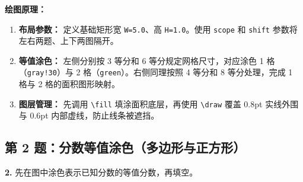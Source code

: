 \vspace{0.5cm}
\textbf{绘图原理：}
\begin{enumerate}
    \item \textbf{布局参数：} 定义基础矩形宽 \texttt{W=5.0}、高 \texttt{H=1.0}。使用 \texttt{scope} 和 \texttt{shift} 参数将左右两题、上下两图隔开。
    \item \textbf{等值涂色：} 左侧分别按 3 等分和 6 等分规定网格尺寸，对应涂色 1 格（\texttt{gray!30}）与 2 格（\texttt{green}）。右侧同理按照 4 等分和 8 等分处理，完成 1 格与 2 格的面积图形映射。
    \item \textbf{图层管理：} 先调用 \texttt{\textbackslash fill} 填涂面积底层，再使用 \texttt{\textbackslash draw} 覆盖 0.8pt 实线外围与 0.6pt 内部虚线，防止线条被遮挡。
\end{enumerate}

\vspace{1.5cm}

\newpage

\subsection{第 2 题：分数等值涂色（多边形与正方形）}

\textbf{2.} 先在图中涂色表示已知分数的等值分数，再填空。

